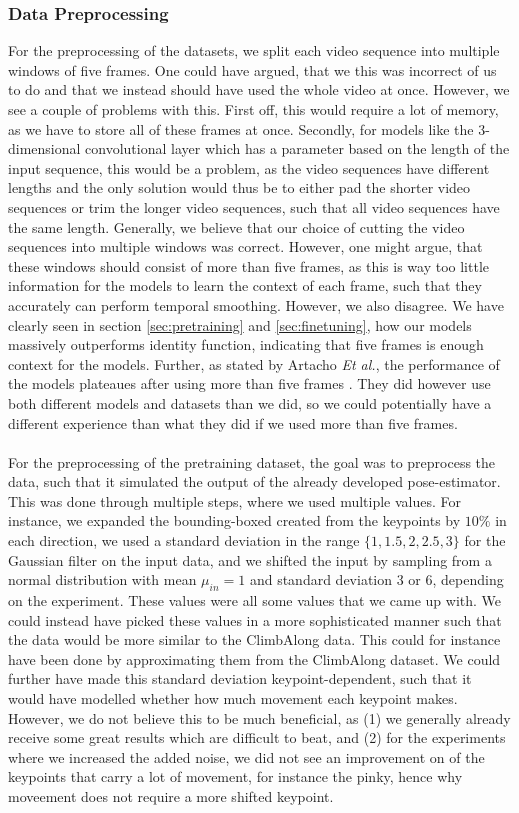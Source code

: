 \documentclass[./main.tex]{subfiles}
\begin{document}
\subsubsection{Data Preprocessing}
For the preprocessing of the datasets, we split each video sequence into multiple windows of five frames. One could have argued, that we this was incorrect of us to do and that we instead should have used the whole video at once. However, we see a couple of problems with this. First off, this would require a lot of memory, as we have to store all of these frames at once. Secondly, for models like the 3-dimensional convolutional layer which has a parameter based on the length of the input sequence, this would be a problem, as the video sequences have different lengths and the only solution would thus be to either pad the shorter video sequences or trim the longer video sequences, such that all video sequences have the same length. Generally, we believe that our choice of cutting the video sequences into multiple windows was correct. However, one might argue, that these windows should consist of more than five frames, as this is way too little information for the models to learn the context of each frame, such that they accurately can perform temporal smoothing. However, we also disagree. We have clearly seen in section \ref{sec:pretraining} and \ref{sec:finetuning}, how our models massively outperforms identity function, indicating that five frames is enough context for the models. Further, as stated by Artacho \textit{Et al.}, the performance of the models plateaues after using more than five frames \cite{https://doi.org/10.48550/arxiv.2001.08095}. They did however use both different models and datasets than we did, so we could potentially have a different experience than what they did if we used more than five frames.
\\
\\
For the preprocessing of the pretraining dataset, the goal was to preprocess the data, such that it simulated the output of the already developed pose-estimator. This was done through multiple steps, where we used multiple values. For instance, we expanded the bounding-boxed created from the keypoints by $10\%$ in each direction, we used a standard deviation in the range $\{1, 1.5, 2, 2.5, 3\}$ for the Gaussian filter on the input data, and we shifted the input by sampling from a normal distribution with mean $\mu_{in} = 1$ and standard deviation $3$ or $6$, depending on the experiment. These values were all some values that we came up with. We could instead have picked these values in a more sophisticated manner such that the data would be more similar to the ClimbAlong data. This could for instance have been done by approximating them from the ClimbAlong dataset. We could further have made this standard deviation keypoint-dependent, such that it would have modelled whether how much movement each keypoint makes. However, we do not believe this to be much beneficial, as (1) we generally already receive some great results which are difficult to beat, and (2) for the experiments where we increased the added noise, we did not see an improvement on of the keypoints that carry a lot of movement, for instance the pinky, hence why moveement does not require a more shifted keypoint.
\end{document}
